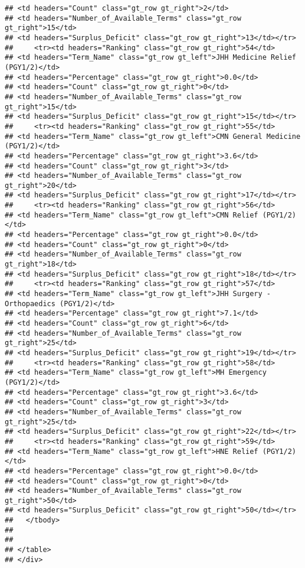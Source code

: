 \documentclass[
]{article}
\begin{document}
\begin{verbatim}
## <td headers="Count" class="gt_row gt_right">2</td>
## <td headers="Number_of_Available_Terms" class="gt_row gt_right">15</td>
## <td headers="Surplus_Deficit" class="gt_row gt_right">13</td></tr>
##     <tr><td headers="Ranking" class="gt_row gt_right">54</td>
## <td headers="Term_Name" class="gt_row gt_left">JHH Medicine Relief (PGY1/2)</td>
## <td headers="Percentage" class="gt_row gt_right">0.0</td>
## <td headers="Count" class="gt_row gt_right">0</td>
## <td headers="Number_of_Available_Terms" class="gt_row gt_right">15</td>
## <td headers="Surplus_Deficit" class="gt_row gt_right">15</td></tr>
##     <tr><td headers="Ranking" class="gt_row gt_right">55</td>
## <td headers="Term_Name" class="gt_row gt_left">CMN General Medicine (PGY1/2)</td>
## <td headers="Percentage" class="gt_row gt_right">3.6</td>
## <td headers="Count" class="gt_row gt_right">3</td>
## <td headers="Number_of_Available_Terms" class="gt_row gt_right">20</td>
## <td headers="Surplus_Deficit" class="gt_row gt_right">17</td></tr>
##     <tr><td headers="Ranking" class="gt_row gt_right">56</td>
## <td headers="Term_Name" class="gt_row gt_left">CMN Relief (PGY1/2)</td>
## <td headers="Percentage" class="gt_row gt_right">0.0</td>
## <td headers="Count" class="gt_row gt_right">0</td>
## <td headers="Number_of_Available_Terms" class="gt_row gt_right">18</td>
## <td headers="Surplus_Deficit" class="gt_row gt_right">18</td></tr>
##     <tr><td headers="Ranking" class="gt_row gt_right">57</td>
## <td headers="Term_Name" class="gt_row gt_left">JHH Surgery - Orthopaedics (PGY1/2)</td>
## <td headers="Percentage" class="gt_row gt_right">7.1</td>
## <td headers="Count" class="gt_row gt_right">6</td>
## <td headers="Number_of_Available_Terms" class="gt_row gt_right">25</td>
## <td headers="Surplus_Deficit" class="gt_row gt_right">19</td></tr>
##     <tr><td headers="Ranking" class="gt_row gt_right">58</td>
## <td headers="Term_Name" class="gt_row gt_left">MH Emergency (PGY1/2)</td>
## <td headers="Percentage" class="gt_row gt_right">3.6</td>
## <td headers="Count" class="gt_row gt_right">3</td>
## <td headers="Number_of_Available_Terms" class="gt_row gt_right">25</td>
## <td headers="Surplus_Deficit" class="gt_row gt_right">22</td></tr>
##     <tr><td headers="Ranking" class="gt_row gt_right">59</td>
## <td headers="Term_Name" class="gt_row gt_left">HNE Relief (PGY1/2)</td>
## <td headers="Percentage" class="gt_row gt_right">0.0</td>
## <td headers="Count" class="gt_row gt_right">0</td>
## <td headers="Number_of_Available_Terms" class="gt_row gt_right">50</td>
## <td headers="Surplus_Deficit" class="gt_row gt_right">50</td></tr>
##   </tbody>
##   
##   
## </table>
## </div>
\end{verbatim}
\end{document}
